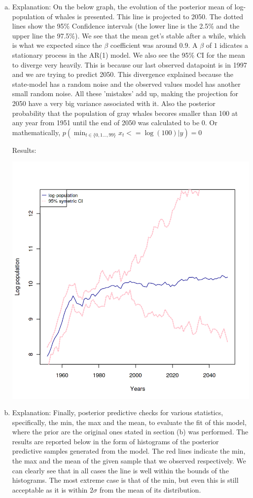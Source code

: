 \documentclass[12pt,a4paper]{article}
\begin{document}
\begin{enumerate}[(a)]
\item
Explanation: On the below graph, the evolution of the posterior mean of log-population of whales is presented. This line is projected to 2050. The dotted lines show the 95\% Confidence intervals (the lower line is the 2.5\% and the upper line the 97.5\%). We see that the mean get's stable after a while, which is what we expected since the $\beta$ coefficient was around $0.9$. A $\beta$ of $1$ idicates a stationary process in the AR(1) model. We also see the 95\% CI for the mean to diverge very heavily. This is because our last observed datapoint is in 1997 and we are trying to predict 2050. This divergence explained because the state-model has a random noise and the observed values model has another small random noise. All these 'mistakes' add up, making the projection for 2050 have a very big variance associated with it.
Also the posterior probability that the population of gray whales becores smaller than 100 at any year from 1951 until the end of 2050 was calculated to be 0. Or mathematically, $p(\min_{t\in \{0,1\ldots,99\}} x_t<=\log(100)|y) = 0$

Results:

\includegraphics[scale=0.25]{./images/1_Figure5_final_plot.png}


\item
Explanation: Finally, posterior predictive checks for various statistics, specifically, the min, the max and the mean, to evaluate the fit of this model, where the prior are the original ones stated in section (b) was performed. The results are reported below in the form of histograms of the posterior predictive samples generated from the model. The red lines indicate the min, the max and the mean of the given sample that we observed respectively. We can clearly see that in all cases the line is well within the bounds of the histograms. The most extreme case is that of the min, but even this is still acceptable as it is within $2 \sigma$ from the mean of its distribution.


\end{enumerate}
\end{document}
